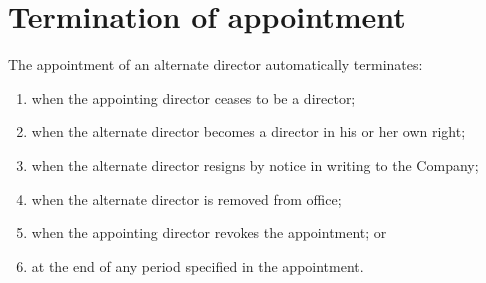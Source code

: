 \section{Termination of appointment}

The appointment of an alternate director automatically terminates:

\begin{enumerate}[label=(\alph*)]
    \item when the appointing director ceases to be a director;
    \item when the alternate director becomes a director in his or her own right;
    \item when the alternate director resigns by notice in writing to the Company;
    \item when the alternate director is removed from office;
    \item when the appointing director revokes the appointment; or
    \item at the end of any period specified in the appointment.
\end{enumerate} 